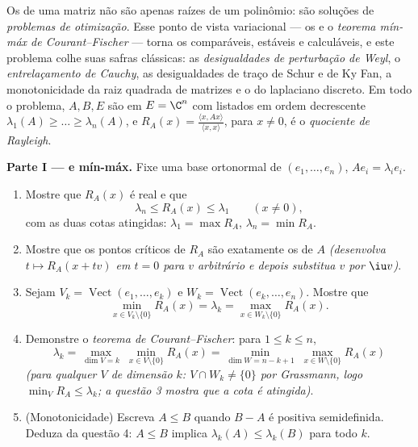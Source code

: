 \begin{problem}\label{pb:b2:hermitian:1}
Os  de uma matriz  não são apenas raízes de um
polinômio: são soluções de \emph{problemas de otimização}.
Esse ponto de vista variacional --- os  e o
\emph{teorema mín-máx de Courant--Fischer}
--- torna os  comparáveis, estáveis e
calculáveis, e este problema colhe suas safras clássicas:
as \emph{desigualdades de perturbação de Weyl}, o \emph{entrelaçamento de Cauchy}, as desigualdades de traço de Schur e de Ky Fan,
a monotonicidade da raiz quadrada de matrizes
e o  do laplaciano discreto. Em todo o problema, $A, B,
E$ são  em $E = \C^n$ com  listados em
ordem decrescente $\lambda_1(A) \geq \dots \geq \lambda_n(A)$,
e $R_A(x) = \frac{\langle x, Ax\rangle}{\langle x, x\rangle}$,
para $x \neq 0$, é o \emph{quociente de Rayleigh}.

\medskip
\noindent\textbf{Parte I ---  e mín-máx.}
Fixe uma base ortonormal de  $(e_1, \dots, e_n)$, $Ae_i =
\lambda_ie_i$.
\begin{enumerate}
  \item Mostre que $R_A(x)$ é real e que
        \[
        \lambda_n \leq R_A(x) \leq \lambda_1
        \qquad (x \neq 0),
        \]
        com as duas cotas atingidas: $\lambda_1 = \max R_A$,
        $\lambda_n = \min R_A$.
  \item Mostre que os pontos críticos de $R_A$ são exatamente os
         de $A$ \emph{(desenvolva $t \mapsto R_A(x +
        tv)$ em $t = 0$ para $v$ arbitrário e depois substitua $v$ por
        $\iu v$)}.
  \item Sejam $V_k = \operatorname{Vect}(e_1, \dots, e_k)$ e
        $W_k = \operatorname{Vect}(e_k, \dots, e_n)$. Mostre que
        \[
        \min_{x \in V_k\setminus\{0\}} R_A(x) = \lambda_k
        = \max_{x \in W_k\setminus\{0\}} R_A(x) .
        \]
  \item Demonstre o \emph{teorema de Courant--Fischer}: para $1 \leq
        k \leq n$,
        \[
        \lambda_k = \max_{\dim V = k}\;\min_{x \in
        V\setminus\{0\}} R_A(x)
        = \min_{\dim W = n-k+1}\;\max_{x \in
        W\setminus\{0\}} R_A(x)
        \]
        \emph{(para qualquer $V$ de dimensão $k$: $V \cap W_k \neq
        \{0\}$ por Grassmann, logo $\min_V R_A \leq \lambda_k$;
        a questão 3 mostra que a cota é atingida)}.
  \item (Monotonicidade) Escreva $A \leq B$ quando $B - A$ é
        positiva semidefinida. Deduza da questão 4: $A \leq
        B$ implica $\lambda_k(A) \leq \lambda_k(B)$ para todo
        $k$.
\end{enumerate}


\end{problem}
